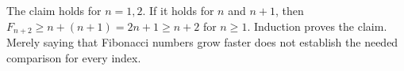 The claim holds for $n=1,2$. If it holds for $n$ and $n+1$, then $F_{n+2}\ge n+(n+1)=2n+1\ge n+2$ for $n\ge1$. Induction proves the claim. Merely saying that Fibonacci numbers grow faster does not establish the needed comparison for every index.
